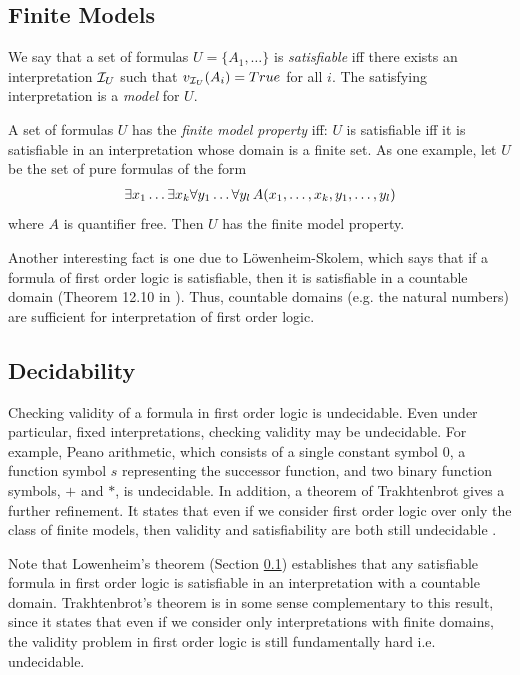 \documentclass[10pt]{article}
\begin{document}
\subsection{Finite Models}
\label{sec:finite-models}

We say that a set of formulas $U=\{A_1,\dots\}$ is \textit{satisfiable} iff there exists an interpretation $\mathcal{I}_U$ such that $v_{\mathcal{I}_U}(A_i)=True$ for all $i$. The satisfying interpretation is a \textit{model} for $U$. 

A set of formulas $U$ has the \textit{finite model property} iff: $U$ is satisfiable iff it is satisfiable in an interpretation whose domain is a finite set. As one example, let $U$ be the set of pure formulas of the form 
\begin{align*}
    \exists x_1 \dots \exists x_k \forall y_1 \dots \forall y_l \, A(x_1,\dots,x_k,y_1,\dots,y_l)
\end{align*}
where $A$ is quantifier free. Then $U$ has the finite model property.

Another interesting fact is one due to L\"{o}wenheim-Skolem, which says that if a formula of first order logic is satisfiable, then it is satisfiable in a countable domain (Theorem 12.10 in \cite{2012benari}). Thus, countable domains (e.g. the natural numbers) are sufficient for interpretation of first order logic.

\subsection{Decidability}

Checking validity of a formula in first order logic is undecidable. Even under particular, fixed interpretations, checking validity may be undecidable. For example, Peano arithmetic, which consists of a single constant symbol $0$, a function symbol $s$ representing the successor function, and two binary function symbols, $+$ and $*$, is undecidable. In addition, a theorem of Trakhtenbrot gives a further refinement. It states that even if we consider first order logic over only the class of finite models, then validity and satisfiability are both still undecidable \cite{libkin2004elements}. 

Note that Lowenheim's theorem (Section \ref{sec:finite-models}) establishes that any satisfiable formula in first order logic is satisfiable in an interpretation with a countable domain. Trakhtenbrot's theorem is in some sense complementary to this result, since it states that even if we consider only interpretations with finite domains, the validity problem in first order logic is still fundamentally hard i.e. undecidable.
\end{document}
